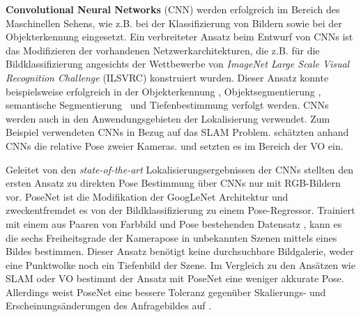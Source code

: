 \textbf{Convolutional Neural Networks} (CNN) werden erfolgreich im Bereich des Maschinellen Sehens, wie z.B. bei der Klassifizierung von Bildern \cite{krizhevskyImageNetClassificationDeep2012} sowie bei der Objekterkennung \cite{girshickRichFeatureHierarchies2014} eingesetzt. 
Ein verbreiteter Ansatz beim Entwurf von CNNs ist das Modifizieren der vorhandenen Netzwerkarchitekturen, die z.B. für die Bildklassifizierung angesichts der Wettbewerbe von \textit{ImageNet Large Scale Visual Recognition Challenge} (ILSVRC) \cite{russakovskyImageNetLargeScale2015} konstruiert wurden. Dieser Ansatz konnte beispielsweise erfolgreich in der Objekterkennung \cite{girshickFastRCNN2015a}, Objektsegmentierung \cite{kokkinosPushingBoundariesBoundary2015}, semantische Segmentierung \cite{ hazirbasFuseNetIncorporatingDepth2017} und Tiefenbestimmung \cite{boliDepthSurfaceNormal2015} verfolgt werden. CNNs werden auch in den Anwendungsgebieten der Lokalisierung verwendet. Zum Beispiel verwendeten \citet{parisottoGlobalPoseEstimation2018} CNNs in Bezug auf das SLAM Problem. \citet{melekhovRelativeCameraPose2017} schätzten anhand CNNs die relative Pose zweier Kameras. \citet{costanteExploringRepresentationLearning2016} und \citet{wangDeepVOEndtoendVisual2017} setzten es im Bereich der VO ein.

Geleitet von den \textit{state-of-the-art} Lokalisierungsergebnissen der CNNs stellten \citet{kendallPoseNetConvolutionalNetwork2015} den ersten Ansatz zu direkten Pose Bestimmung über CNNs nur mit RGB-Bildern vor. PoseNet ist die Modifikation der GoogLeNet \cite{szegedyGoingDeeperConvolutions2015} Architektur und zweckentfremdet es von der Bildklassifizierung zu einem Pose-Regressor. Trainiert mit einem aus Paaren von Farbbild und Pose bestehenden Datensatz , kann es die sechs Freiheitsgrade der Kamerapose in unbekannten Szenen mittels eines Bildes bestimmen. Dieser Ansatz benötigt keine durchsuchbare Bildgalerie, weder eine Punktwolke noch ein Tiefenbild der Szene. Im Vergleich zu den Ansätzen wie SLAM oder VO bestimmt der Ansatz mit PoseNet eine weniger akkurate Pose. Allerdings weist PoseNet eine bessere Toleranz gegenüber Skalierungs- und Erscheinungsänderungen des Anfragebildes auf \cite{piascoSurveyVisualBasedLocalization2018}.

